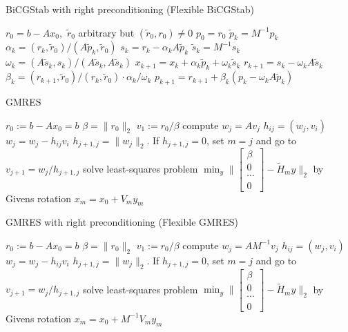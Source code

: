 \documentclass[10pt]{article}
\begin{document}
\begin{algorithm}[H]
  \caption{BiCGStab with right preconditioning (Flexible BiCGStab) \citep{chen2016analysis}}\label{alg:CG}
  \begin{algorithmic}[1]
    \State $r_0=b-Ax_0,$ $\tilde{r}_0$ arbitrary but $(\tilde{r}_0,r_0)\neq 0$
    \State $p_0 = r_0$
    \State $\tilde{p}_k=M^{-1}p_k$
    \State $\alpha_k = (r_k , \tilde{r}_0 )/(A\tilde{p}_k, \tilde{r}_0 )$
    \State $s_k=r_k-\alpha_k A\tilde{p}_k$
    \State $\tilde{s}_k=M^{-1}s_k$
    \State $\omega_k = (A\tilde{s}_k , s_k )/(A\tilde{s}_k,A\tilde{s}_k ) $
    \State $x_{k+1} = x_k + \alpha_k  \tilde{p}_k + \omega_k \tilde{s}_k$
    \State $r_{k+1}=s_k-\omega_k A\tilde{s}_k$
    \State $\beta_k = (r_{k+1},\tilde{r}_0 )/(r_k,\tilde{r}_0 )\cdot \alpha_k/\omega_k$
    \State $p_{k+1}=r_{k+1}+\beta_k(p_k-\omega_k A\tilde{p}_k)$
    \EndFor
  \end{algorithmic}
\end{algorithm}

\begin{algorithm}[H]
  \caption{GMRES \citep[algorithm 6.9]{Saad_2003_IMS}}
  \begin{algorithmic}[1]
    \State $r_0:=b-A x_0=b$
    \State $\beta=\|r_0\|_2$
    \State $v_1:=r_0/\beta$
    \State compute $w_j=Av_j$
        \State $h_{ij}=(w_j,v_i)$
        \State $w_j=w_j-h_{ij} v_i$
        \EndFor
    \State $h_{j+1,j}=\|w_j\|_2$. If $h_{j+1,j}=0$, set $m=j$ and go to
    \State $v_{j+1} = w_j/h_{j+1,j}$
    \State solve least-squares problem $\min_y\|\begin{bmatrix}
    \beta\\
    0\\
    \cdots\\
    0
    \end{bmatrix}- \tilde{H}_m y\|_2$ by Givens rotation
    \EndFor
    \State $x_m = x_0+V_m y_m$
  \end{algorithmic}
\end{algorithm}


\begin{algorithm}[H]
  \caption{GMRES with right preconditioning (Flexible GMRES)\citep[algorithm 9.5]{Saad_2003_IMS}}\label{alg:CG}
  \begin{algorithmic}[1]
    \State $r_0:=b-A x_0=b$
    \State $\beta=\|r_0\|_2$
    \State $v_1:=r_0/\beta$
    \State compute $w_j=AM^{-1}v_j$
        \State $h_{ij}=(w_j,v_i)$
        \State $w_j=w_j-h_{ij} v_i$
        \EndFor
    \State $h_{j+1,j}=\|w_j\|_2$. If $h_{j+1,j}=0$, set $m=j$ and go to
    \State $v_{j+1} = w_j/h_{j+1,j}$
    \State solve least-squares problem $\min_y\|\begin{bmatrix}
    \beta\\
    0\\
    \cdots\\
    0
    \end{bmatrix}- \tilde{H}_m y\|_2$ by Givens rotation
    \EndFor
    \State $x_m = x_0+M^{-1}V_m y_m$
  \end{algorithmic}
\end{algorithm}
\end{document}
